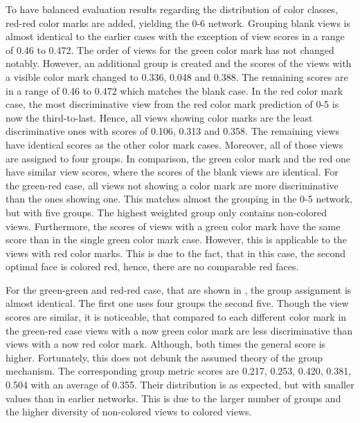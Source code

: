 To have balanced evaluation results regarding the distribution of color classes, red-red color marks are added, yielding the 0-6 network.
Grouping blank views is almost identical to the earlier cases with the exception of view scores in a range of 0.46 to 0.472.
The order of views for the green color mark has not changed notably.
However, an additional group is created and the scores of the views with a visible color mark changed to 0.336, 0.048 and 0.388.
The remaining scores are in a range of 0.46 to 0.472 which matches the blank case.
In the red color mark case, the most discriminative view from the red color mark prediction of 0-5 is now the third-to-last.
Hence, all views showing color marks are the least discriminative ones with scores of 0.106, 0.313 and 0.358.
The remaining views have identical scores as the other color mark cases.
Moreover, all of those views are assigned to four groups.
In comparison, the green color mark and the red one have similar view scores, where the scores of the blank views are identical.
For the green-red case, all views not showing a color mark are more discriminative than the ones showing one.
This matches almost the grouping in the 0-5 network, but with five groups.
The highest weighted group only contains non-colored views.
Furthermore, the scores of views with a green color mark have the same score than in the single green color mark case.
However, this is applicable to the views with red color marks.
This is due to the fact, that in this case, the second optimal face is colored red, hence, there are no comparable red faces.

For the green-green and red-red case, that are shown in , the group assignment is almost identical.
The first one uses four groups the second five.
Though the view scores are similar, it is noticeable, that compared to each different color mark in the green-red case views with a now green color mark are less discriminative than views with a now red color mark.
Although, both times the general score is higher.
Fortunately, this does not debunk the assumed theory of the group mechanism.
The corresponding group metric scores are 0.217, 0.253, 0.420, 0.381, 0.504 with an average of 0.355.
Their distribution is as expected, but with smaller values than in earlier networks.
This is due to the larger number of groups and the higher diversity of non-colored views to colored views.

